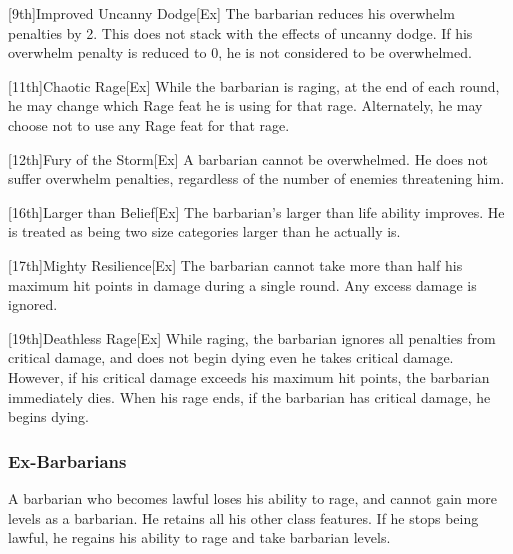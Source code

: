 [9th]{Improved Uncanny Dodge}[Ex]
The barbarian reduces his overwhelm penalties by 2.
This does not stack with the effects of uncanny dodge.
If his overwhelm penalty is reduced to 0, he is not considered to be overwhelmed.

[11th]{Chaotic Rage}[Ex]
While the barbarian is raging, at the end of each round, he may change which Rage feat he is using for that rage.
Alternately, he may choose not to use any Rage feat for that rage.

[12th]{Fury of the Storm}[Ex]
A barbarian cannot be overwhelmed.
He does not suffer overwhelm penalties, regardless of the number of enemies threatening him.

[16th]{Larger than Belief}[Ex]
The barbarian's larger than life ability improves.
He is treated as being two size categories larger than he actually is.

[17th]{Mighty Resilience}[Ex]
The barbarian cannot take more than half his maximum hit points in damage during a single round.
Any excess damage is ignored.

[19th]{Deathless Rage}[Ex]
While raging, the barbarian ignores all penalties from critical damage, and does not begin dying even he takes critical damage.
However, if his critical damage exceeds his maximum hit points, the barbarian immediately dies.
When his rage ends, if the barbarian has critical damage, he begins dying.

\subsubsection{Ex-Barbarians}
A barbarian who becomes lawful loses his ability to rage, and cannot gain more levels as a barbarian.
He retains all his other class features.
If he stops being lawful, he regains his ability to rage and take barbarian levels.

